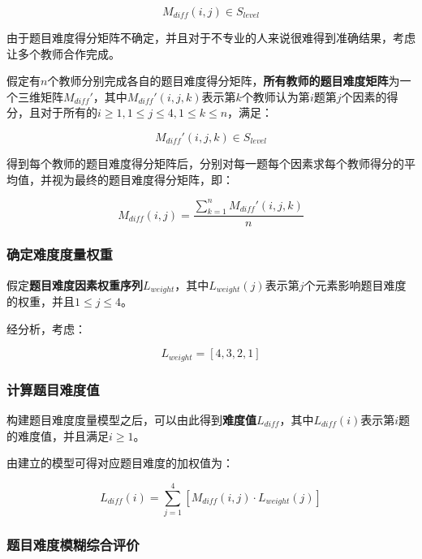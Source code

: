 \begin{equation}
M_{diff}(i, j)\in S_{level}
\end{equation}

由于题目难度得分矩阵不确定，并且对于不专业的人来说很难得到准确结果，考虑让多个教师合作完成。

假定有$n$个教师分别完成各自的题目难度得分矩阵，\textbf{所有教师的题目难度矩阵}为一个三维矩阵$M_{diff}'$，其中$M_{diff}'(i, j, k)$表示第$k$个教师认为第$i$题第$j$个因素的得分，且对于所有的$i \geq 1, 1 \leq j \leq 4, 1 \leq k \leq n$，满足：

\begin{equation}
M_{diff}'(i, j, k)\in S_{level}
\end{equation}

得到每个教师的题目难度得分矩阵后，分别对每一题每个因素求每个教师得分的平均值，并视为最终的题目难度得分矩阵，即：

\begin{equation}
    M_{diff}(i, j) = 
    \frac{
        \sum_{k = 1}^{n}M_{diff}'(i, j, k)
    }{n}
\end{equation}

\subsubsection{确定难度度量权重}

假定\textbf{题目难度因素权重序列}$L_{weight}$，其中$L_{weight}(j)$表示第$j$个元素影响题目难度的权重，并且$1 \leq j \leq 4$。

经分析，考虑：

\begin{equation}
    L_{weight} = [4, 3, 2, 1]
\end{equation}

\subsubsection{计算题目难度值}

构建题目难度度量模型之后，可以由此得到\textbf{难度值}$L_{diff}$，其中$L_{diff}(i)$表示第$i$题的难度值，并且满足$i \geq 1$。

由建立的模型可得对应题目难度的加权值为：

\begin{equation}
    L_{diff}(i) = 
    \sum_{j = 1}^{4} \left [ 
        M_{diff}(i, j) \cdot L_{weight}(j)
    \right ]
\end{equation}

\subsubsection{题目难度模糊综合评价}

